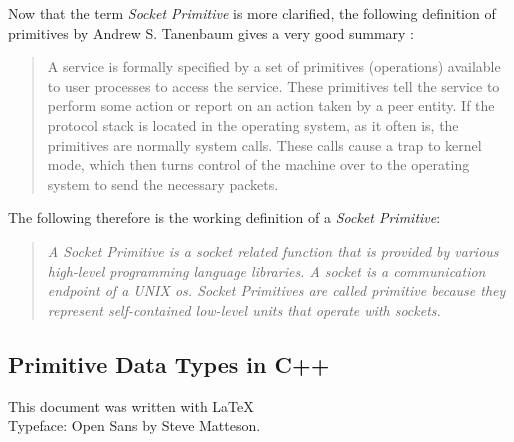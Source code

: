 \documentclass[xcolor=dvipsnames]{article}
\begin{document}
Now that the term \textit{Socket Primitive} is more clarified, the following definition of primitives by Andrew S. Tanenbaum gives a very good summary \cite[p. 38, ch. 1.3.4]{computer_networks}:

\begin{quote}
A service is formally specified by a set of primitives (operations) available to user processes to access the service. These primitives tell the service to perform some action or report on an action taken by a peer entity. If the protocol stack is located in the operating system, as it often is, the primitives are normally system calls. These calls cause a trap to kernel mode, which then turns control of the machine over to the operating system to send the necessary packets.
\end{quote}

\noindent The following therefore is the working definition of a \textit{Socket Primitive}:

\begin{quote}

\textit{A \textit{Socket Primitive} is a socket related function that is provided by various high-level programming language libraries. A socket is a communication endpoint of a UNIX \gls{os}. Socket Primitives are called primitive because they represent self-contained low-level units that operate with sockets.}

\end{quote}

\newpage

\begin{appendix}

\section{Primitive Data Types in C++}\label{c++_data_types}



\end{appendix}

\newpage

\printnoidxglossaries




\vfill
\begin{center}
This document was written with \LaTeX 
\\Typeface: Open Sans by Steve Matteson.
\end{center}

\end{document}

